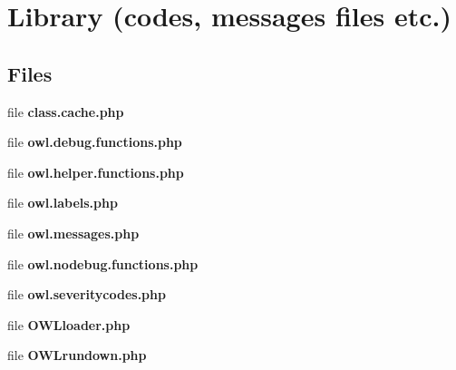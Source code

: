 \section{Library (codes, messages files etc.)}
\label{group__OWL__LIBRARY}
\subsection*{Files}
\begin{DoxyCompactItemize}
\item 
file {\bf class.cache.php}
\item 
file {\bf owl.debug.functions.php}
\item 
file {\bf owl.helper.functions.php}
\item 
file {\bf owl.labels.php}
\item 
file {\bf owl.messages.php}
\item 
file {\bf owl.nodebug.functions.php}
\item 
file {\bf owl.severitycodes.php}
\item 
file {\bf OWLloader.php}
\item 
file {\bf OWLrundown.php}
\end{DoxyCompactItemize}
